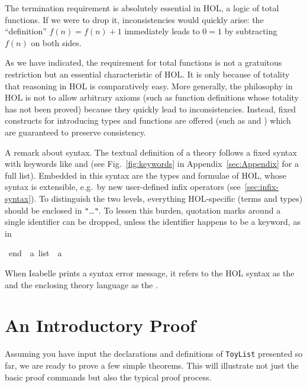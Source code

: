 \begin{isabellebody}
\begin{isamarkuptext}
The termination requirement is absolutely essential in HOL, a logic of total
functions. If we were to drop it, inconsistencies would quickly arise: the
``definition'' $f(n) = f(n)+1$ immediately leads to $0 = 1$ by subtracting
$f(n)$ on both sides.

\begin{warn}
  As we have indicated, the requirement for total functions is not a gratuitous
  restriction but an essential characteristic of HOL\@. It is only
  because of totality that reasoning in HOL is comparatively easy.  More
  generally, the philosophy in HOL is not to allow arbitrary axioms (such as
  function definitions whose totality has not been proved) because they
  quickly lead to inconsistencies. Instead, fixed constructs for introducing
  types and functions are offered (such as  and
  ) which are guaranteed to preserve consistency.
\end{warn}

A remark about syntax.  The textual definition of a theory follows a fixed
syntax with keywords like  and  (see
Fig.~\ref{fig:keywords} in Appendix~\ref{sec:Appendix} for a full list).
Embedded in this syntax are the types and formulae of HOL, whose syntax is
extensible, e.g.\ by new user-defined infix operators
(see~\ref{sec:infix-syntax}). To distinguish the two levels, everything
HOL-specific (terms and types) should be enclosed in
\texttt{"}\dots\texttt{"}. 
To lessen this burden, quotation marks around a single identifier can be
dropped, unless the identifier happens to be a keyword, as in%
\end{isamarkuptext}%
\ {\isachardoublequote}end{\isachardoublequote}\ {\isacharcolon}{\isacharcolon}\ {\isachardoublequote}{\isacharprime}a\ list\ {\isasymRightarrow}\ {\isacharprime}a{\isachardoublequote}%
\begin{isamarkuptext}%
\noindent
When Isabelle prints a syntax error message, it refers to the HOL syntax as
the  and the enclosing theory language as the .


\section{An Introductory Proof}
\label{sec:intro-proof}

Assuming you have input the declarations and definitions of \texttt{ToyList}
presented so far, we are ready to prove a few simple theorems. This will
illustrate not just the basic proof commands but also the typical proof
process.


\end{isamarkuptext}
\end{isabellebody}
